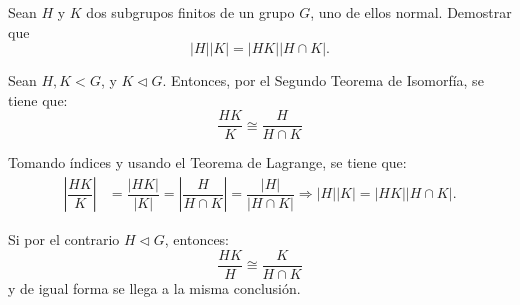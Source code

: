 \begin{ejercicio}
    Sean $H$ y $K$ dos subgrupos finitos de un grupo $G$, uno de ellos normal. Demostrar que
    \[
        |H||K| = |HK||H\cap K|.
    \]

    Sean $H,K<G$, y $K\lhd G$. Entonces, por el Segundo Teorema de Isomorfía, se tiene que:
    \begin{equation*}
        \dfrac{HK}{K} \cong \dfrac{H}{H\cap K}
    \end{equation*}

    Tomando índices y usando el Teorema de Lagrange, se tiene que:
    \begin{align*}
        \left|\dfrac{HK}{K}\right| &= \dfrac{|HK|}{|K|} = \left|\dfrac{H}{H\cap K}\right| = \dfrac{|H|}{|H\cap K|}\Longrightarrow |H||K| = |HK||H\cap K|.
    \end{align*}

    Si por el contrario $H\lhd G$, entonces:
    \begin{equation*}
        \dfrac{HK}{H} \cong \dfrac{K}{H\cap K}
    \end{equation*}
    y de igual forma se llega a la misma conclusión.
\end{ejercicio}

